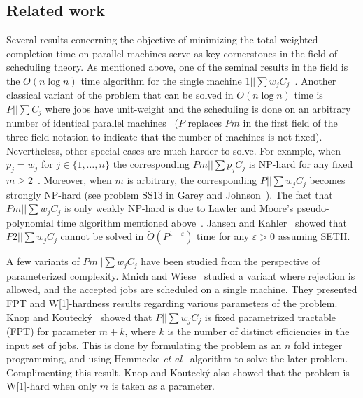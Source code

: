 \documentclass[11pt]{llncs}
\begin{document}
\subsection{Related work}

Several results concerning the objective of minimizing the total weighted completion time on parallel machines serve as key cornerstones in the field of scheduling theory. As mentioned above, one of the seminal results in the field is the $O(n \log n)$ time algorithm for the single machine $1||\sum w_jC_j$~\cite{Smith1956}. Another classical variant of the problem that can be solved in $O(n \log n)$ time is $P|| \sum C_j$ where jobs have unit-weight and the scheduling is done on an arbitrary number of identical parallel machines~\cite{ConwayMM1967} ($P$ replaces $Pm$ in the first field of the three field notation to indicate that the number of machines is not fixed). Nevertheless, other special cases are much harder to solve. For example, when $p_j=w_j$ for $j\in\{1,\ldots,n\}$ the corresponding $Pm||\sum p_j C_j$ is NP-hard for any fixed $m \geq 2$~\cite{BrunoCoffman}. Moreover, when $m$ is arbitrary, the corresponding $P||\sum w_j C_j$ becomes strongly NP-hard (see problem SS13 in Garey and Johnson~\cite{GareyJohnson}). The fact that $Pm||\sum w_j C_j$ is only weakly NP-hard is due to Lawler and Moore's pseudo-polynomial time algorithm mentioned above~\cite{LawlerMoore}. Jansen and Kahler~\cite{Jansenee} showed that $P2||\sum w_j C_j$ cannot be solved in $\tilde{O}(P^{1-\varepsilon})$ time for any $\varepsilon > 0$ assuming SETH.%

A few variants of $Pm||\sum w_jC_j$ have been studied from the perspective of parameterized complexity. Mnich and Wiese~\cite{MnichW15} studied a variant where rejection is allowed, and the accepted jobs are scheduled on a single machine. They presented FPT and W[1]-hardness results regarding various parameters of the problem.
Knop and Kouteck{\'{y}}~\cite{DBLP:journals/scheduling/KnopK18} showed that $P||\sum w_j C_j$ is fixed parametrized tractable (FPT) for parameter $m+k$, where $k$ is the number of distinct efficiencies in the input set of jobs. This is done by formulating the problem as an $n$ fold integer programming, and using Hemmecke \emph{et al}~\cite{DBLP:journals/mp/HemmeckeOR13} algorithm to solve the later problem. Complimenting this result, Knop and Kouteck{\'{y}} also showed that the problem is W[1]-hard when only $m$ is taken as a parameter.%
\end{document}

